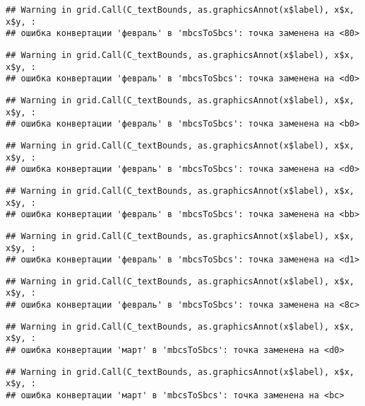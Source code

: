 \documentclass[
]{article}
\begin{document}
\begin{verbatim}
## Warning in grid.Call(C_textBounds, as.graphicsAnnot(x$label), x$x, x$y, :
## ошибка конвертации 'февраль' в 'mbcsToSbcs': точка заменена на <80>
\end{verbatim}

\begin{verbatim}
## Warning in grid.Call(C_textBounds, as.graphicsAnnot(x$label), x$x, x$y, :
## ошибка конвертации 'февраль' в 'mbcsToSbcs': точка заменена на <d0>
\end{verbatim}

\begin{verbatim}
## Warning in grid.Call(C_textBounds, as.graphicsAnnot(x$label), x$x, x$y, :
## ошибка конвертации 'февраль' в 'mbcsToSbcs': точка заменена на <b0>
\end{verbatim}

\begin{verbatim}
## Warning in grid.Call(C_textBounds, as.graphicsAnnot(x$label), x$x, x$y, :
## ошибка конвертации 'февраль' в 'mbcsToSbcs': точка заменена на <d0>
\end{verbatim}

\begin{verbatim}
## Warning in grid.Call(C_textBounds, as.graphicsAnnot(x$label), x$x, x$y, :
## ошибка конвертации 'февраль' в 'mbcsToSbcs': точка заменена на <bb>
\end{verbatim}

\begin{verbatim}
## Warning in grid.Call(C_textBounds, as.graphicsAnnot(x$label), x$x, x$y, :
## ошибка конвертации 'февраль' в 'mbcsToSbcs': точка заменена на <d1>
\end{verbatim}

\begin{verbatim}
## Warning in grid.Call(C_textBounds, as.graphicsAnnot(x$label), x$x, x$y, :
## ошибка конвертации 'февраль' в 'mbcsToSbcs': точка заменена на <8c>
\end{verbatim}

\begin{verbatim}
## Warning in grid.Call(C_textBounds, as.graphicsAnnot(x$label), x$x, x$y, :
## ошибка конвертации 'март' в 'mbcsToSbcs': точка заменена на <d0>
\end{verbatim}

\begin{verbatim}
## Warning in grid.Call(C_textBounds, as.graphicsAnnot(x$label), x$x, x$y, :
## ошибка конвертации 'март' в 'mbcsToSbcs': точка заменена на <bc>
\end{verbatim}
\end{document}
